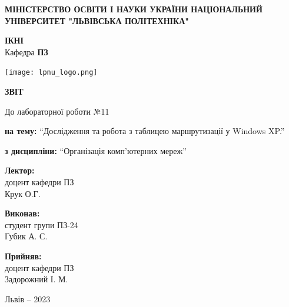 \documentclass[12pt]{extarticle}
\begin{document}
\begin{titlepage}
    \begin{center}
        \textbf{\normalsize{\MakeUppercase{
            Міністерство Освіти і науки України
            Національний університет "Львівська політехніка"
        }}}

        \begin{flushright}
        \textbf{ІКНІ}\\
        Кафедра \textbf{ПЗ}
        \end{flushright}
        \vspace{15mm}

        \texttt{[image: lpnu\_logo.png]}

        \vspace*{\fill}

        \textbf{\normalsize{\MakeUppercase{Звіт}}}
            
        До лабораторної роботи №11

        \textbf{на тему:} “Дослідження та робота з таблицею маршрутизації у Windows XP.”

        \textbf{з дисципліни:} “Організація комп'ютерних мереж”
            
        \vspace*{\fill}

        \begin{flushright}

            \textbf{Лектор:}\\
            доцент кафедри ПЗ\\
            Крук О.Г.\\
            \vspace{12pt}

            \textbf{Виконав:}\\
            студент групи ПЗ-24\\
            Губик А. С.\\
            \vspace{12pt}

            \textbf{Прийняв:}\\
            доцент кафедри ПЗ\\
            Задорожний І. М.\\
        \vspace{12pt}
        \end{flushright}

        Львів -- 2023
            
            
    \end{center}
\end{titlepage}
\end{document}
